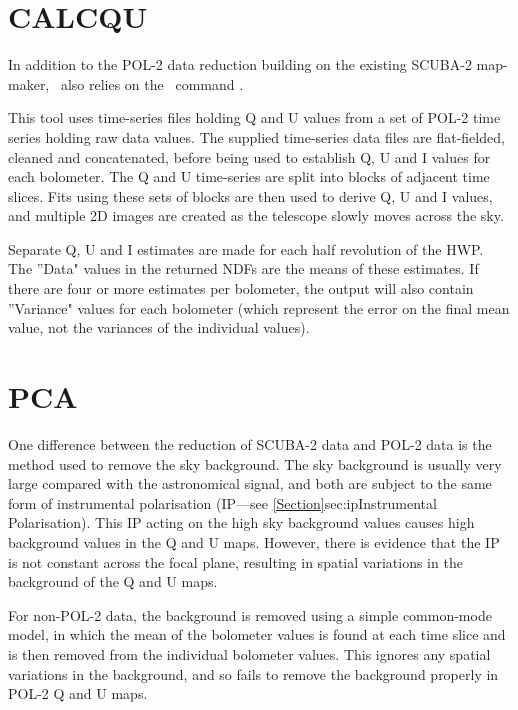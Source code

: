 \section{CALCQU}
\label{sec:calcqu}

In addition to the POL-2 data reduction building on the
existing SCUBA-2 map-maker, \poltwomap\ also relies on the \SMURF\
command .

This  tool uses time-series files holding Q
and U values from a set of POL-2 time series holding raw data values.
The supplied time-series data files are flat-fielded, cleaned and concatenated,
before being used to establish Q, U and I values for each bolometer. The Q
and U time-series are split into blocks of adjacent time slices. Fits
using these sets of blocks are then used to derive Q, U and I values, and
multiple 2D images are created as the telescope slowly moves across the sky.

Separate Q, U and I estimates are made for each half revolution of the HWP.
The ''Data" values in the returned NDFs are the means of these estimates. If
there are four or more estimates per bolometer, the output will also contain
''Variance" values for each bolometer (which represent the error on
the final mean value, not the variances of the individual values).

\section{PCA}
\label{sec:pca}

One difference between the reduction of SCUBA-2 data and POL-2 data is the
method used to remove the sky background.  The sky background is usually
very large compared with the astronomical signal, and both are subject to
the same form of instrumental polarisation (IP---see
\cref{Section}{sec:ip}{Instrumental Polarisation}). This
IP acting on the high sky background values causes high background values
in the Q and U maps. However, there is evidence that the IP is not
constant across the focal plane, resulting in spatial variations in the
background of the Q and U maps.

For non-POL-2 data, the background is removed using a simple common-mode
model, in which the mean of the bolometer values is found at each time
slice and is then removed from the individual bolometer values. This
ignores any spatial variations in the background, and so fails to remove
the background properly in POL-2 Q and U maps.


